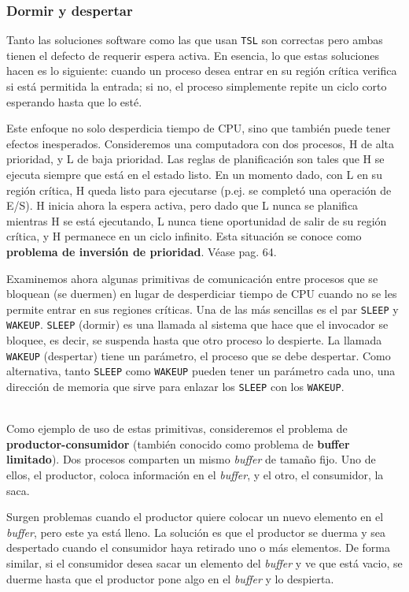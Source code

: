 \documentclass{article}
\begin{document}
\subsubsection*{Dormir y despertar}
Tanto las soluciones software como las que usan {\tt TSL} son 
correctas pero ambas tienen el defecto de requerir espera activa. 
En esencia, lo que estas soluciones hacen es lo siguiente: cuando 
un proceso desea entrar en su regi\'on cr\'itica verifica si est\'a 
permitida la entrada; si no, el proceso simplemente repite un ciclo 
corto esperando hasta que lo est\'e.

Este enfoque no solo desperdicia tiempo de CPU, sino que tambi\'en 
puede tener efectos inesperados. Consideremos una computadora con 
dos procesos, H de alta prioridad, y L de baja prioridad. Las 
reglas de planificaci\'on son tales que H se ejecuta siempre que 
est\'a en el estado listo. En un momento dado, con L en su regi\'on 
cr\'itica, H queda listo para ejecutarse (p.ej. se complet\'o una 
operaci\'on de E/S). H inicia ahora la espera activa, pero dado que 
L nunca se planif\/ica mientras H se est\'a ejecutando, L nunca tiene 
oportunidad de salir de su regi\'on cr\'itica, y H permanece en un 
ciclo infinito. Esta situaci\'on se conoce como {\bf problema de 
inversi\'on de prioridad}. V\'ease \cite{Tanenbaum} pag. 64.

Examinemos ahora algunas primitivas de comunicaci\'on entre procesos 
que se bloquean (se duermen) en lugar de desperdiciar tiempo de CPU 
cuando no se les permite entrar en sus regiones cr\'iticas. Una de las 
m\'as sencillas es el par {\tt SLEEP} y {\tt WAKEUP}. {\tt SLEEP} 
(dormir) es una llamada al sistema que hace que el invocador se 
bloquee, es decir, se suspenda hasta que otro proceso lo despierte. 
La llamada {\tt WAKEUP} (despertar) tiene un par\'ametro, el proceso 
que se debe despertar. Como alternativa, tanto {\tt SLEEP} como 
{\tt WAKEUP} pueden tener un par\'ametro cada uno, una direcci\'on de 
memoria que sirve para enlazar los {\tt SLEEP} con los {\tt WAKEUP}.

\\
Como ejemplo de uso de estas primitivas, consideremos el problema de 
{\bf productor-consumidor} (tambi\'en conocido como problema de 
{\bf buffer limitado}). Dos procesos comparten un mismo {\it buffer} 
de tama\~no fijo. Uno de ellos, el productor, coloca informaci\'on en 
el {\it buffer}, y el otro, el consumidor, la saca.

Surgen problemas cuando el productor quiere colocar un nuevo elemento 
en el {\it buffer}, pero este ya est\'a lleno. La soluci\'on es que el 
productor se duerma y sea despertado cuando el consumidor haya 
retirado uno o m\'as elementos. De forma similar, si el consumidor 
desea sacar un elemento del {\it buffer} y ve que est\'a vacio, se 
duerme hasta que el productor pone algo en el {\it buffer} y lo despierta.
\end{document}
